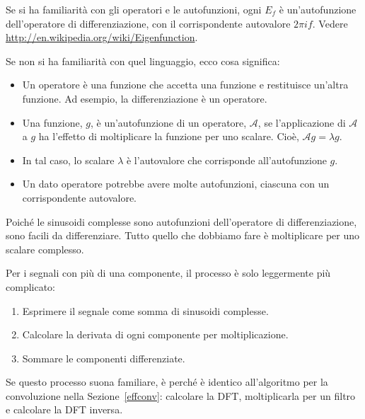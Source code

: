 \documentclass[12pt,a4paper]{book}
\begin{document}
Se si ha familiarità con gli operatori e le autofunzioni, ogni $E_f$ è un'autofunzione dell'operatore di differenziazione, con il corrispondente autovalore $2 \pi i f$. Vedere \url{http://en.wikipedia.org/wiki/Eigenfunction}.

Se non si ha familiarità con quel linguaggio, ecco cosa significa:

\newcommand{\op}{\mathcal{A}}

\begin{itemize} 

\item Un operatore è una funzione che accetta una funzione e restituisce un'altra funzione. Ad esempio, la differenziazione è un operatore.

\item Una funzione, $g$, è un'autofunzione di un operatore, $\op$, se l'applicazione di $\op$ a $g$ ha l'effetto di moltiplicare la funzione per uno scalare. Cioè, $\op g = \lambda g$.

\item In tal caso, lo scalare $\lambda$ è l'autovalore che corrisponde all'autofunzione $g$.

\item Un dato operatore potrebbe avere molte autofunzioni, ciascuna con un corrispondente autovalore.

\end{itemize} 

Poiché le sinusoidi complesse sono autofunzioni dell'operatore di differenziazione, sono facili da differenziare. Tutto quello che dobbiamo fare è moltiplicare per uno scalare complesso.

Per i segnali con più di una componente, il processo è solo leggermente più complicato:

\begin{enumerate} 

\item Esprimere il segnale come somma di sinusoidi complesse.

\item Calcolare la derivata di ogni componente per moltiplicazione.

\item Sommare le componenti differenziate.

\end{enumerate} 

Se questo processo suona familiare, è perché è identico all'algoritmo per la convoluzione nella Sezione~\ref{effconv}: calcolare la DFT, moltiplicarla per un filtro e calcolare la DFT inversa.
\end{document}
